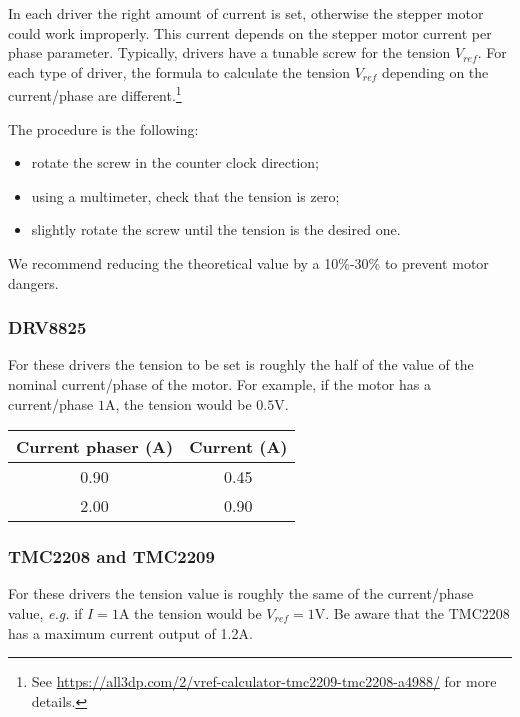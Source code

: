 In each driver the right amount of current is set, otherwise the stepper motor could work improperly.
This current depends on the stepper motor current per phase parameter.
Typically, drivers have a tunable screw for the tension \(V_{ref}\).
For each type of driver, the formula to calculate the tension \(V_{ref}\) depending on the current/phase are different.\footnote{See \url{https://all3dp.com/2/vref-calculator-tmc2209-tmc2208-a4988/} for more details.}

The procedure is the following:
\begin{itemize}
    \item rotate the screw in the counter clock direction;
    \item using a multimeter, check that the tension is zero;
    \item slightly rotate the screw until the tension is the desired one.
\end{itemize}
We recommend reducing the theoretical value by a 10\%-30\% to prevent motor dangers.

\subsubsection{DRV8825}
For these drivers the tension to be set is roughly the half of the value of the nominal current/phase of the motor.
For example, if the motor has a current/phase \(1\)A, the tension would be \(0.5\)V.

\begin{minipage}
    {.4\textwidth}
    \begin{tabular}{cc}
        Current phaser (A) & Current (A) \\
        \hline
        0.90 & 0.45 \\
        2.00 & 0.90             
    \end{tabular}
    \label{tab:drivers_curr}
\end{minipage} 

\subsubsection{TMC2208 and TMC2209}
For these drivers the tension value is roughly the same of the current/phase value, \textit{e.g.} if \(I=1\)A the tension would be \(V_{ref}=1\)V.
Be aware that the TMC2208 has a maximum current output of 1.2A.

